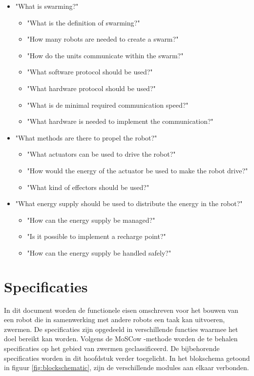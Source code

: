 \documentclass[10pt,a4paper]{article}
\begin{document}
\begin{itemize}

    \item "What is swarming?"
    \begin{itemize}
        \item "What is the definition of swarming?"
        \item "How many robots are needed to create a swarm?"
        \item "How do the units communicate within the swarm?"
    \end{itemize}    
    \begin{itemize}
        \item "What software protocol should be used?"
        \item "What hardware protocol should be used?"
        \item "What is de minimal required communication speed?"
        \item "What hardware is needed to implement the communication?"
    \end{itemize}
    \item "What methods are there to propel the robot?"
    \begin{itemize}
        \item "What actuators can be used to drive the robot?"
        \item "How would the energy of the actuator be used to make the robot drive?"
        \item "What kind of effectors should be used?"
    \end{itemize}
    \item "What energy supply should be used to distribute the energy in the robot?"
    \begin{itemize}
        \item "How can the energy supply be managed?"
        \item "Is it possible to implement a recharge point?"
        \item "How can the energy supply be handled safely?"
    \end{itemize}
\end{itemize}
\newpage

\section{Specificaties}
In dit document worden de functionele eisen omschreven voor het bouwen van een robot die in samenwerking met andere robots een taak kan uitvoeren, zwermen. De specificaties zijn opgedeeld in verschillende functies waarmee het doel bereikt kan worden. 
Volgens de MoSCow -methode worden de te behalen specificaties op het gebied van zwermen geclassificeerd. De bijbehorende specificaties worden in dit hoofdstuk verder toegelicht. In het blokschema getoond in figuur \ref{fig:blockschematic}, zijn de verschillende modules aan elkaar verbonden. 
\end{document}
